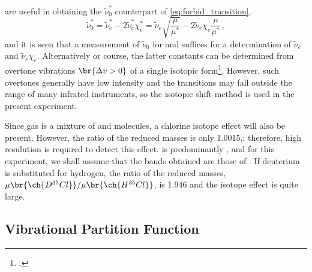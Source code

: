 \documentclass[nobib,nofonts,nols,nohyper]{tufte-handout}
\begin{document}
 are useful in obtaining the \( \widetilde{\nu}_0^* \) counterpart of \cref{eq:forbid_transition},
\begin{equation}
	\widetilde{\nu}_0^* = \widetilde{\nu}_e^* - 2\widetilde{\nu}_e^* \chi_e^* = \widetilde{\nu}_e \sqrt{\frac{\mu}{\mu^*}} - 2 \widetilde{\nu}_e \chi_e \frac{\mu}{\mu^*} \, ,
	\label{eq:forbidden_isotope_transition} 
\end{equation}
and it is seen that a measurement of \( \widetilde{\nu}_0 \) for  and  suffices for a determination of \( \widetilde{\nu}_e \) and \( \widetilde{\nu}_e \chi_e \). 
Alternatively or course, the latter constants can be determined from overtone vibrations \( \br{\Delta v > 0} \) of a single isotopic form\Footcite[See Exp. 39 in][]{nibler14}. 
However, such overtones generally have low intensity and the transitions may fall outside the range of many infrated instruments, so the isotopic shift method is used in the present experiment. 

Since  gas is a mixture of  and  molecules, a chlorine isotope effect will also be present. 
However, the ratio of the reduced masses is only \num{1.0015},: therefore, high resulution is required to detect this effect. 
 is predominantly , and for this experiment, we shall assume that the  bands obtained are those of . 
If deuterium is substituted for hydrogen, the ratio of the reduced masses, \( \mu\br{\ch{D^{35}Cl}} / \mu\br{\ch{H^{35}Cl}} \), is \num{1.946} and the isotope effect is quite large. 


\subsection[Vibrational Partition Function]{Vibrational Partition Function\autocite{levine95,mcquarrie73,lewis61}} %
\label{sub:vibrational_partition_function}
\end{document}
